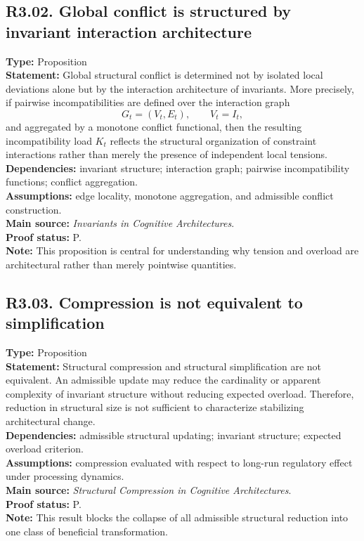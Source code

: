 \documentclass[12pt]{article}
\begin{document}
	\subsection*{R3.02. Global conflict is structured by invariant interaction architecture}
	\textbf{Type:} Proposition \\
	\textbf{Statement:} Global structural conflict is determined not by isolated local deviations
	alone but by the interaction architecture of invariants. More precisely, if pairwise
	incompatibilities are defined over the interaction graph
	\[
	G_t=(V_t,E_t), \qquad V_t=I_t,
	\]
	and aggregated by a monotone conflict functional, then the resulting incompatibility load
	$K_t$ reflects the structural organization of constraint interactions rather than merely the
	presence of independent local tensions. \\
	\textbf{Dependencies:} invariant structure; interaction graph; pairwise incompatibility
	functions; conflict aggregation. \\
	\textbf{Assumptions:} edge locality, monotone aggregation, and admissible conflict
	construction. \\
	\textbf{Main source:} \emph{Invariants in Cognitive Architectures}. \\
	\textbf{Proof status:} P. \\
	\textbf{Note:} This proposition is central for understanding why tension and overload are
	architectural rather than merely pointwise quantities.
	
	\subsection*{R3.03. Compression is not equivalent to simplification}
	\textbf{Type:} Proposition \\
	\textbf{Statement:} Structural compression and structural simplification are not equivalent.
	An admissible update may reduce the cardinality or apparent complexity of invariant structure
	without reducing expected overload. Therefore, reduction in structural size is not sufficient
	to characterize stabilizing architectural change. \\
	\textbf{Dependencies:} admissible structural updating; invariant structure; expected overload
	criterion. \\
	\textbf{Assumptions:} compression evaluated with respect to long-run regulatory effect under
	processing dynamics. \\
	\textbf{Main source:} \emph{Structural Compression in Cognitive Architectures}. \\
	\textbf{Proof status:} P. \\
	\textbf{Note:} This result blocks the collapse of all admissible structural reduction into one
	class of beneficial transformation.
	
\end{document}
